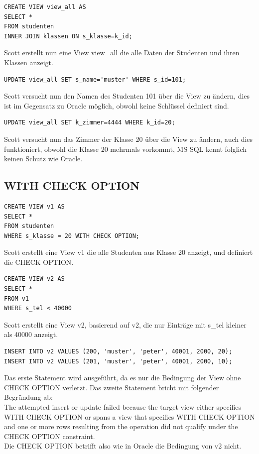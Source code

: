 \documentclass[10pt]{scrreprt}
\begin{document}
\begin{lstlisting}[style=sql]
CREATE VIEW view_all AS
SELECT *
FROM studenten
INNER JOIN klassen ON s_klasse=k_id;
\end{lstlisting}
Scott erstellt nun eine View view\_all die alle Daten der Studenten und ihren Klassen anzeigt.

\begin{lstlisting}[style=sql]
UPDATE view_all SET s_name='muster' WHERE s_id=101;
\end{lstlisting}
Scott versucht nun den Namen des Studenten 101 über die View zu ändern, dies ist im Gegensatz zu Oracle möglich, obwohl keine Schlüssel definiert sind.

\begin{lstlisting}[style=sql]
UPDATE view_all SET k_zimmer=4444 WHERE k_id=20;
\end{lstlisting}
Scott versucht nun das Zimmer der Klasse 20 über die View zu ändern, 
auch dies funktioniert, obwohl die Klasse 20 mehrmals vorkommt, MS SQL kennt folglich keinen Schutz wie Oracle.

\subsection{WITH CHECK OPTION}
\begin{lstlisting}[style=sql]
CREATE VIEW v1 AS
SELECT *
FROM studenten
WHERE s_klasse = 20 WITH CHECK OPTION;
\end{lstlisting}
Scott erstellt eine View v1 die alle Studenten aus Klasse 20 anzeigt, und definiert die CHECK OPTION.

\begin{lstlisting}[style=sql]
CREATE VIEW v2 AS
SELECT *
FROM v1
WHERE s_tel < 40000
\end{lstlisting}
Scott erstellt eine View v2, basierend auf v2, die nur Einträge mit s\_tel kleiner als 40000 anzeigt.

\begin{lstlisting}[style=sql]
INSERT INTO v2 VALUES (200, 'muster', 'peter', 40001, 2000, 20);
INSERT INTO v2 VALUES (201, 'muster', 'peter', 40001, 2000, 10);
\end{lstlisting}
Das erste Statement wird ausgeführt, da es nur die Bedingung der View ohne CHECK OPTION verletzt. Das zweite Statement bricht mit folgender Begründung ab:\\
The attempted insert or update failed because the target view either specifies WITH CHECK OPTION or spans a view that specifies WITH CHECK OPTION and one or more rows resulting from the operation did not qualify under the CHECK OPTION constraint.\\
Die CHECK OPTION betrifft also wie in Oracle die Bedingung von v2 nicht.
\end{document}
